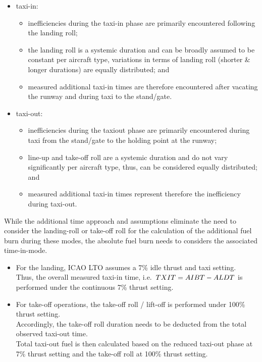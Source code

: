 \documentclass[
  a4paper,
  DIV=11,
  numbers=noendperiod]{scrreprt}
\providecommand{\tightlist}{%
  \setlength{\itemsep}{0pt}\setlength{\parskip}{0pt}}\usepackage{longtable,booktabs,array}
\begin{document}
\begin{itemize}
\tightlist
\item
  taxi-in:

  \begin{itemize}
  \tightlist
  \item
    inefficiencies during the taxi-in phase are primarily encountered
    following the landing roll;
  \item
    the landing roll is a systemic duration and can be broadly assumed
    to be constant per aircraft type, variations in terms of landing
    roll (shorter \& longer durations) are equally distributed; and
  \item
    measured additional taxi-in times are therefore encountered after
    vacating the runway and during taxi to the stand/gate.
  \end{itemize}
\item
  taxi-out:

  \begin{itemize}
  \tightlist
  \item
    inefficiencies during the taxiout phase are primarily encountered
    during taxi from the stand/gate to the holding point at the runway;
  \item
    line-up and take-off roll are a systemic duration and do not vary
    significantly per aircraft type, thus, can be considered equally
    distributed; and
  \item
    measured additional taxi-in times represent therefore the
    inefficiency during taxi-out.
  \end{itemize}
\end{itemize}

While the additional time approach and assumptions eliminate the need to
consider the landing-roll or take-off roll for the calculation of the
additional fuel burn during these modes, the absolute fuel burn needs to
considers the associated time-in-mode.

\begin{itemize}
\tightlist
\item
  For the landing, ICAO LTO assumes a 7\% idle thrust and taxi
  setting.\\
  Thus, the overall measured taxi-in time,
  i.e.~\(\small TXIT = AIBT - ALDT\) is performed under the continuous
  7\% thrust setting.
\item
  For take-off operations, the take-off roll / lift-off is performed
  under 100\% thrust setting.\\
  Accordingly, the take-off roll duration needs to be deducted from the
  total observed taxi-out time.\\
  Total taxi-out fuel is then calculated based on the reduced taxi-out
  phase at 7\% thrust setting and the take-off roll at 100\% thrust
  setting.
\end{itemize}
\end{document}
